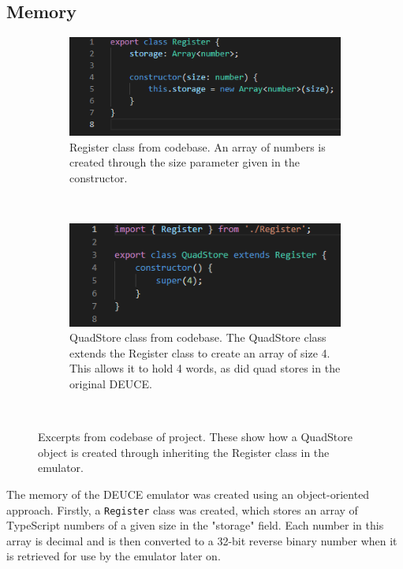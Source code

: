 \documentclass{l4proj}
\begin{document}
\subsection{Memory}
\begin{figure}[h]
	\centering
	\begin{subfigure}[t]{0.45\textwidth}
		\includegraphics[width=\textwidth]{images/register-class}
		\caption{Register class from codebase. An array of numbers is created through the size parameter given in the constructor.}
		\label{fig:reg-class}
	\end{subfigure}
	\quad
	~ %
	\begin{subfigure}[t]{0.45\textwidth}
		\includegraphics[width=\textwidth]{images/quad-store-class}
		\caption{QuadStore class from codebase. The QuadStore class extends the Register class to create an array of size 4. This allows it to hold 4 words, as did quad stores in the original DEUCE.}
		\label{fig:quad-class}
	\end{subfigure}
	~ %
	\caption{Excerpts from codebase of project. These show how a QuadStore object is created through inheriting the Register class in the emulator.}
	\label{fig:mem-classes}
\end{figure}
The memory of the DEUCE emulator was created using an object-oriented approach. Firstly, a \texttt{Register} class was created, which stores an array of TypeScript numbers of a given size in the "storage" field. Each number in this array is decimal and is then converted to a 32-bit reverse binary number when it is retrieved for use by the emulator later on. 
\end{document}
